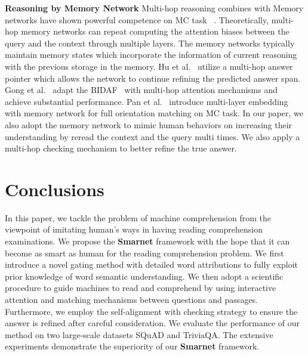 \documentclass[letterpaper]{article} %
\begin{document}
 \noindent \textbf{Reasoning by Memory Network} Multi-hop reasoning combines with Memory networks have shown powerful competence on MC task~\cite{shen2017reasonet} \cite{Dhingra2017Gated} \cite{Sordoni2016Iterative} \cite{xiong2016dynamic} \cite{Hu2017Mnemonic} \cite{Gong2017Ruminating} \cite{Kumar2016AskMA}. Theoretically, multi-hop memory networks can repeat computing the attention biases between the query and the context through multiple layers. The memory networks typically maintain memory states which incorporate the information of current reasoning with the previous storage in the memory. Hu et al.~\cite{Hu2017Mnemonic} utilize a multi-hop answer pointer which allows the network to continue refining the predicted answer span. Gong et al.~\cite{Gong2017Ruminating} adapt the BIDAF~\cite{seo2016bidirectional} with multi-hop attention mechanisms and achieve substantial performance. Pan et al.~\cite{Pan2017MEMEN} introduce multi-layer embedding with memory network for full orientation matching on MC task. In our paper, we also adopt the memory network to mimic human behaviors on increasing their understanding by reread the context and the query multi times. We also apply a multi-hop checking mechanism to better refine the true answer.

\section{Conclusions}
In this paper, we tackle the problem of machine comprehension from the viewpoint of imitating human's ways in having reading comprehension examinations. We propose the \textbf{Smarnet} framework with the hope that it can become as smart as human for the reading comprehension problem. We first introduce a novel gating method with detailed word attributions to fully exploit prior knowledge of word semantic understanding. We then adopt a scientific procedure to guide machines to read and comprehend by using interactive attention and matching mechanisms between questions and passages. Furthermore, we employ the self-alignment with checking strategy to ensure the answer is refined after careful consideration. We evaluate the performance of our method on two large-scale datasets SQuAD and TriviaQA. The extensive experiments demonstrate the superiority of our \textbf{Smarnet} framework. 


\end{document}
